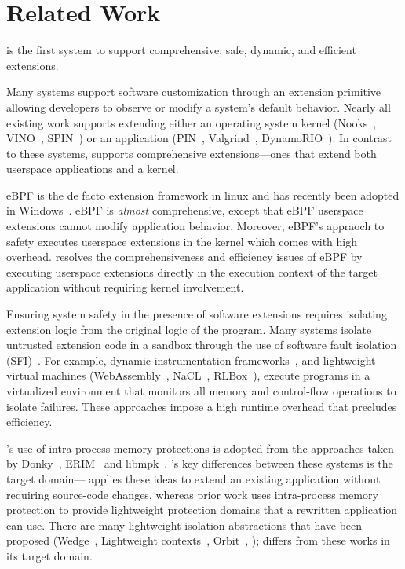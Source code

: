 \section{Related Work}\label{sec:related_work}
\sys is the first system to support comprehensive, safe, dynamic, and efficient extensions. 

Many systems support software customization through an extension primitive allowing developers to observe or modify a system's default behavior.  Nearly all existing work supports extending either an operating system kernel (\eg Nooks~\cite{Swift03}, VINO~\cite{Seltzer96}, SPIN~\cite{Bershad95}) or an application (\eg PIN~\cite{Luk05}, Valgrind~\cite{Nethercote07}, DynamoRIO~\cite{Bruening12}).  In contrast to these systems, \sys supports comprehensive extensions---\ie ones that extend both userspace applications and a kernel.

eBPF is the de facto extension framework in linux and has recently been adopted in Windows~\cite {eBPFWindows}.  eBPF is \emph{almost} comprehensive, except that eBPF userspace extensions cannot modify application behavior.  Moreover, eBPF's appraoch to safety executes userspace extensions in the kernel which comes with high overhead.  \sys{} resolves the comprehensiveness and efficiency issues of eBPF by executing userspace extensions directly in the execution context of the target application without requiring kernel involvement.

Ensuring system safety in the presence of software extensions requires isolating extension logic from the original logic of the program.  Many systems isolate untrusted extension code in a sandbox through the use of software fault isolation (SFI)~\cite{Wahbe93}.  For example,  dynamic instrumentation frameworks~\cite{Luk05, Nethercote07, Bruening12}, and lightweight virtual machines (\eg WebAssembly~\cite{webassembly}, NaCL~\cite{Yee09}, RLBox~\cite{Narayan20}), execute programs in a virtualized environment that monitors all memory and control-flow operations to isolate failures.  These approaches impose a high runtime overhead that precludes efficiency.

\sys{}'s use of intra-process memory protections is adopted from the approaches taken by Donky~\cite{schrammel2020donky}, ERIM~\cite{Vahldiek19} and libmpk~\cite{Park19}.  \sys{}'s key differences between these systems is the target domain---\sys{} applies these ideas to extend an existing application without requiring source-code changes, whereas prior work uses intra-process memory protection to provide lightweight protection domains that a rewritten application can use. There are many lightweight isolation abstractions that have been proposed (\eg Wedge~\cite{Bittau08}, Lightweight contexts~\cite{Litton16}, Orbit~\cite{Jing22}, \etc); \sys{} differs from these works in its target domain.

